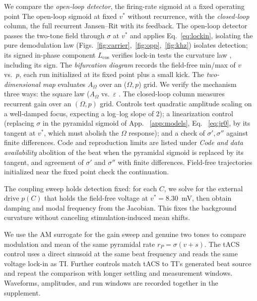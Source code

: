 \documentclass[11pt,a4paper]{article}
\newcommand{\Sig}{\sigma}
\providecommand{\DIFaddtex}[1]{{\protect\color{blue} \sf #1}} %
\providecommand{\DIFdeltex}[1]{{\protect\color{red} \scriptsize #1}} %
\providecommand{\DIFaddbegin}{} %
\providecommand{\DIFaddend}{} %
\providecommand{\DIFdelbegin}{} %
\providecommand{\DIFdelend}{} %
\providecommand{\DIFadd}[1]{\texorpdfstring{\DIFaddtex{#1}}{#1}} %
\providecommand{\DIFdel}[1]{\texorpdfstring{\DIFdeltex{#1}}{}} %
\begin{document}
\DIFdelbegin \DIFdel{We compare the \emph{open-loop detector}, the firing-rate sigmoid at a fixed operating point }\DIFdelend \DIFaddbegin \DIFadd{The open-loop sigmoid at fixed }\DIFaddend $v^*$ \DIFdelbegin \DIFdel{without recurrence, with the \emph{closed-loop} column, the full recurrent
Jansen--Rit with its feedback. The open-loop detector passes the two-tone field through
$\Sig$ at $v^*$ and applies Eq.~\eqref{eq:lockin}, isolating the pure demodulation law
(Figs.~\ref{fig:carrier},~\ref{fig:opp},~\ref{fig:khz})}\DIFdelend \DIFaddbegin \DIFadd{isolates detection}\DIFaddend ; its signed \DIFdelbegin \DIFdel{in-phase
component $L_{\cos}$ verifies }\DIFdelend \DIFaddbegin \DIFadd{lock-in
tests }\DIFaddend the curvature law\DIFdelbegin \DIFdel{, including its sign. The \emph{bifurcation
diagram} records the field-free min/max of $v$ vs.\ $p$, each run initialized at
its fixed point plus a small kick. The \emph{two-dimensional map} evaluates
$A_\Omega$ over
an ($\Omega,p$) grid. We verify the mechanism three ways: the
square law ($A_\Omega$ vs.\ $\varepsilon$ }\DIFdelend \DIFaddbegin \DIFadd{. The closed-loop column measures recurrent gain over
an $(\Omega,p)$ grid. Controls test quadratic amplitude scaling }\DIFaddend on a well-damped
focus, \DIFdelbegin \DIFdel{expecting a
log--log slope of $2$); a linearization control (replacing $\Sig$ in
the pyramidal sigmoid of App.
~\ref{app:models}, Eq.
~\eqref{eq:jr0}, by its tangent at $v^*$, which must abolish the $\Omega$
response); and a check of $\Sig',\Sig''$ against finite differences. Code and reproduction limits are listed under \emph{Code and data availability}}\DIFdelend \DIFaddbegin \DIFadd{abolition of the beat when the pyramidal sigmoid is replaced by its
tangent, and agreement of $\Sig'$ and $\Sig''$ with finite differences.
Field-free trajectories initialized near the fixed point check the continuation.
}

\DIFadd{The coupling sweep holds detection fixed: for each $C$, we solve for the external
drive $p(C)$ that holds the field-free voltage at $v^*=8.30$~mV, then obtain damping and modal frequency
from the Jacobian. This fixes the background curvature without canceling
stimulation-induced mean shifts.
}

\DIFadd{We use the AM surrogate for the gain sweep and genuine two tones to compare
modulation and mean of the same pyramidal rate
$r_P=\Sig(v+s)$. The tACS control uses a direct sinusoid at the same beat
frequency and reads the same voltage lock-in as TI. Further controls match
tACS to TI's generated beat source and repeat the comparison with longer
settling and measurement windows. Waveforms, amplitudes, and run windows
are recorded together in the supplement}\DIFaddend .
\end{document}
